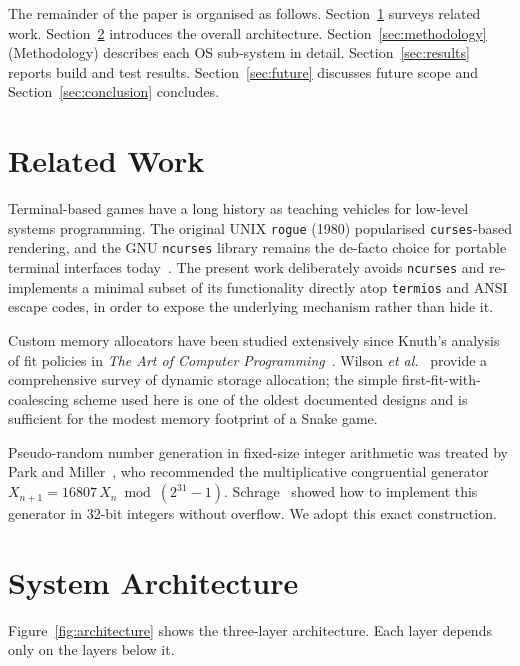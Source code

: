 \documentclass[conference]{IEEEtran}
\begin{document}
The remainder of the paper is organised as follows. Section~\ref{sec:related} surveys related work. Section~\ref{sec:arch} introduces the overall architecture. Section~\ref{sec:methodology} (Methodology) describes each OS sub-system in detail. Section~\ref{sec:results} reports build and test results. Section~\ref{sec:future} discusses future scope and Section~\ref{sec:conclusion} concludes.

\section{Related Work}
\label{sec:related}

Terminal-based games have a long history as teaching vehicles for low-level systems programming. The original UNIX \texttt{rogue} (1980) popularised \texttt{curses}-based rendering, and the GNU \texttt{ncurses} library remains the de-facto choice for portable terminal interfaces today~\cite{ncurses}. The present work deliberately avoids \texttt{ncurses} and re-implements a minimal subset of its functionality directly atop \texttt{termios} and ANSI escape codes, in order to expose the underlying mechanism rather than hide it.

Custom memory allocators have been studied extensively since Knuth's analysis of fit policies in \textit{The Art of Computer Programming}~\cite{knuth1997}. Wilson \emph{et al.}~\cite{wilson1995} provide a comprehensive survey of dynamic storage allocation; the simple first-fit-with-coalescing scheme used here is one of the oldest documented designs and is sufficient for the modest memory footprint of a Snake game.

Pseudo-random number generation in fixed-size integer arithmetic was treated by Park and Miller~\cite{park1988}, who recommended the multiplicative congruential generator $X_{n+1} = 16807 \, X_n \bmod (2^{31}-1)$. Schrage~\cite{schrage1979} showed how to implement this generator in 32-bit integers without overflow. We adopt this exact construction.

\section{System Architecture}
\label{sec:arch}

Figure~\ref{fig:architecture} shows the three-layer architecture. Each layer depends only on the layers below it.
\end{document}

